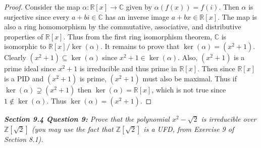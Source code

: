 \documentclass{article}
\begin{document}
  \begin{proof}
    Consider the map $\alpha:\mathbb{R}[x]\rightarrow\mathbb{C}$ given by
    $\alpha(f(x))=f(i)$. Then $\alpha$ is surjective since every
    $a+bi\in\mathbb{C}$ has an inverse image $a+bx\in\mathbb{R}[x]$. The
    map is also a ring homomorphism by the commutative, associative, and
    distributive properties of $\mathbb{R}[x]$. Thus from the first ring
    isomorphism theorem, $\mathbb{C}$ is isomorphic to
    $\mathbb{R}[x]/\ker(\alpha)$. It remains to prove that
    $\ker(\alpha)=(x^2+1)$. Clearly $(x^2+1)\subseteq\ker(\alpha)$ since
    $x^2+1\in\ker(\alpha)$. Also, $(x^2+1)$ is a prime ideal since $x^2+1$
    is irreducible and thus prime in $\mathbb{R}[x]$. Then since
    $\mathbb{R}[x]$ is a PID and $(x^2+1)$ is prime, $(x^2+1)$ must also be
    maximal. Thus if $\ker(\alpha)\supsetneq(x^2+1)$ then
    $\ker(\alpha)=\mathbb{R}[x]$, which is not true since
    $1\not\in\ker(\alpha)$. Thus $\ker(\alpha)=(x^2+1)$.
  \end{proof}

\it \textbf{Section 9.4 Question 9:} Prove that the polynomial
  $x^2-\sqrt{2}$ is irreducible over $\mathbb{Z}[\sqrt{2}]$ (you may use
  the fact that $\mathbb{Z}[\sqrt{2}]$ is a UFD, from Exercise 9 of Section
  8.1).
\end{document}

